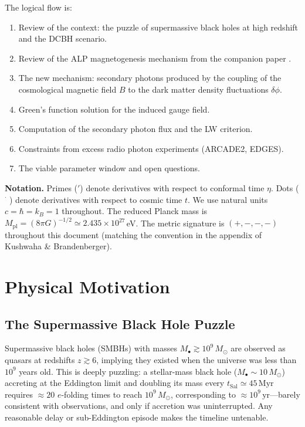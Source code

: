 \documentclass[12pt,a4paper]{report}
\newcommand{\Mpl}{M_{\mathrm{pl}}}
\theoremstyle{definition}
\begin{document}
The logical flow is:
\begin{enumerate}[noitemsep]
  \item Review of the context: the puzzle of supermassive black holes at high redshift
    and the DCBH scenario.
  \item Review of the ALP magnetogenesis mechanism from the companion paper
    \cite{Brandenberger2026}.
  \item The new mechanism: secondary photons produced by the coupling of the
    cosmological magnetic field $B$ to the dark matter density fluctuations $\delta\phi$.
  \item Green's function solution for the induced gauge field.
  \item Computation of the secondary photon flux and the LW criterion.
  \item Constraints from excess radio photon experiments (ARCADE2, EDGES).
  \item The viable parameter window and open questions.
\end{enumerate}

\noindent\textbf{Notation.} Primes ($'$) denote derivatives with respect to conformal
time $\eta$. Dots ($\dot{\phantom{x}}$) denote derivatives with respect to cosmic
time $t$. We use natural units $c=\hbar=k_B=1$ throughout. The reduced Planck mass
is $\Mpl=(8\pi G)^{-1/2}\simeq 2.435\times 10^{27}$\,eV. The metric signature is
$(+,-,-,-)$ throughout this document (matching the convention in the appendix of
Kushwaha \& Brandenberger).

\chapter{Physical Motivation}

\section{The Supermassive Black Hole Puzzle}

Supermassive black holes (SMBHs) with masses $M_{\bullet}\gtrsim 10^9\,M_\odot$ are
observed as quasars at redshifts $z\gtrsim 6$, implying they existed when the universe
was less than $10^9$ years old. This is deeply puzzling: a stellar-mass black hole
($M_\bullet\sim 10\,M_\odot$) accreting at the Eddington limit and doubling its mass
every $t_{\mathrm{Sal}}\simeq 45\,\mathrm{Myr}$ requires $\approx 20$ $e$-folding times
to reach $10^9\,M_\odot$, corresponding to $\approx 10^9\,\mathrm{yr}$---barely
consistent with observations, and only if accretion was uninterrupted. Any reasonable
delay or sub-Eddington episode makes the timeline untenable.
\end{document}
